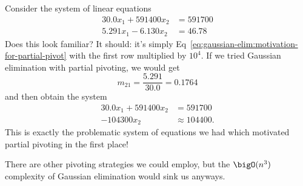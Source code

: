 \begin{example}
Consider the system of linear equations
\begin{subequations}
\begin{align}
30.0x_{1} + 591400 x_{2} &= 591700\\
5.291x_{1} - 6.130 x_{2} &= 46.78
\end{align}
\end{subequations}
Does this look familiar? It should: it's simply Eq~\eqref{eq:gaussian-elim:motivation-for-partial-pivot}
with the first row multiplied by $10^{4}$. If we tried Gaussian
elimination with partial pivoting, we would get
\begin{equation*}
m_{21}=\frac{5.291}{30.0}=0.1764
\end{equation*}
and then obtain the system
\begin{subequations}
\begin{align}
30.0x_{1} + 591400 x_{2} &= 591700\\
-104300 x_{2} &\approx 104400.
\end{align}
\end{subequations}
This is exactly the problematic system of equations we had which
motivated partial pivoting in the first place!
\end{example}

There are other pivoting strategies we could employ, but the
$\bigO(n^{3})$ complexity of Gaussian elimination would sink us
anyways. 